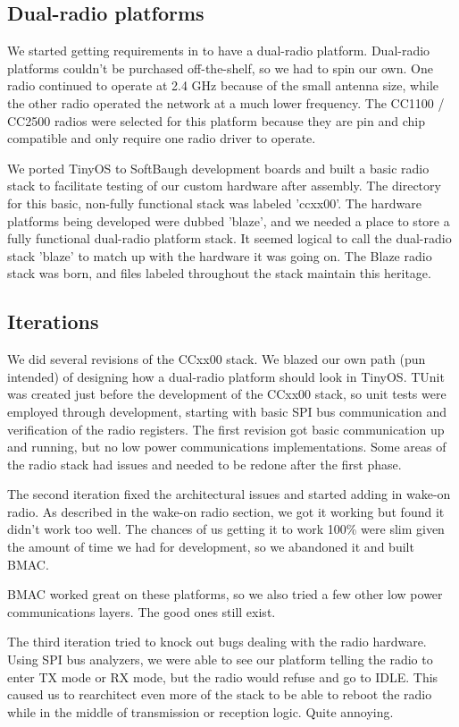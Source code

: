 \documentclass{article}
\begin{document}
\subsection{Dual-radio platforms}
We started getting requirements in to have a dual-radio platform.  Dual-radio platforms couldn't be purchased off-the-shelf,
so we had to spin our own. One radio continued to operate at 2.4 GHz because of the small antenna size, 
while the other radio operated the network at a much lower frequency.  The CC1100 / CC2500 radios 
were selected for this platform because they are pin and chip compatible and only require one radio driver to operate.

We ported TinyOS to SoftBaugh \cite{softbaugh} development boards and built a basic radio stack to facilitate testing
of our custom hardware after assembly.  The directory for this basic, non-fully functional stack was labeled 'ccxx00'.
The hardware platforms being developed were dubbed 'blaze', and we needed a place to store a fully functional
dual-radio platform stack. It seemed logical to call the dual-radio stack 'blaze' to match up with the hardware
it was going on.  The Blaze radio stack was born, and files labeled throughout the stack maintain this heritage.

\subsection{Iterations}
We did several revisions of the CCxx00 stack.  We blazed our own path (pun intended) of designing how a dual-radio platform
should look in TinyOS. TUnit was created just before the development of the CCxx00 stack, so unit tests were employed
through development, starting with basic SPI bus communication and verification of the radio registers. 
The first revision got basic communication up and running, but no low power communications implementations. Some areas of the radio stack had issues and needed to be redone after the first phase.  

The second iteration fixed the architectural issues and started adding in wake-on radio. As described in the
wake-on radio section, we got it working but found it didn't work too well. The chances of us getting it to work
100\% were slim given the amount of time we had for development, so we abandoned it and built BMAC. 

BMAC worked great on these platforms, so we also tried a few other low power communications layers. The good
ones still exist.

The third iteration tried to knock out bugs dealing with the radio hardware. Using SPI bus analyzers, we
were able to see our platform telling the radio to enter TX mode or RX mode, but the radio would refuse and go 
to IDLE.  This caused us to rearchitect even more of the stack to be able to reboot the radio while in the
middle of transmission or reception logic. Quite annoying.
\end{document}
